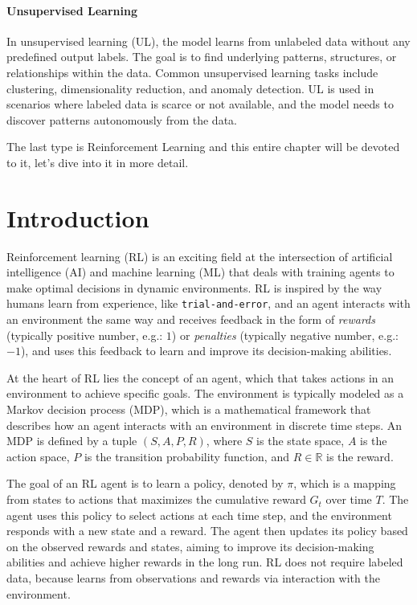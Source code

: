 \documentclass[../xlapes02]{subfiles}
\begin{document}
    \paragraph{Unsupervised Learning}
    In unsupervised learning (UL), the model learns from unlabeled data without any predefined output labels. The goal is to find underlying patterns, structures, or relationships within the data. Common unsupervised learning tasks include clustering, dimensionality reduction, and anomaly detection. UL is used in scenarios where labeled data is scarce or not available, and the model needs to discover patterns autonomously from the data.

    The last type is Reinforcement Learning and this entire chapter will be devoted to it, let's dive into it in more detail.


    \section{Introduction}\label{sec:rl-introduction}
    Reinforcement learning (RL) is an exciting field at the intersection of artificial intelligence (AI) and machine learning (ML) that deals with training agents to make optimal decisions in dynamic environments. RL is inspired by the way humans learn from experience, like \texttt{trial-and-error}, and an agent interacts with an environment the same way and receives feedback in the form of \emph{rewards} (typically positive number, e.g.: $1$) or \emph{penalties} (typically negative number, e.g.: $-1$), and uses this feedback to learn and improve its decision-making abilities.

    At the heart of RL lies the concept of an agent, which that takes actions in an environment to achieve specific goals. The environment is typically modeled as a Markov decision process (MDP), which is a mathematical framework that describes how an agent interacts with an environment in discrete time steps. An MDP is defined by a tuple $(S, A, P, R)$, where $S$ is the state space, $A$ is the action space, $P$ is the transition probability function, and $R\in\mathbb{R}$ is the reward.

    The goal of an RL agent is to learn a policy, denoted by $\pi$, which is a mapping from states to actions that maximizes the cumulative reward $G_t$ over time $T$. The agent uses this policy to select actions at each time step, and the environment responds with a new state and a reward. The agent then updates its policy based on the observed rewards and states, aiming to improve its decision-making abilities and achieve higher rewards in the long run. RL does not require labeled data, because learns from observations and rewards via interaction with the environment.
\end{document}
